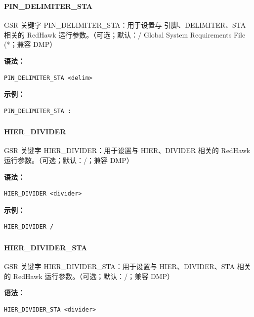 \subsubsection{}
\paragraph*{PIN_DELIMITER_STA}

GSR 关键字 PIN_DELIMITER_STA：用于设置与 引脚、DELIMITER、STA 相关的 RedHawk 运行参数。（可选；默认：/ Global System Requirements File (*；兼容 DMP）

\textbf{语法：}
\begin{lstlisting}
PIN_DELIMITER_STA <delim>
\end{lstlisting}

\textbf{示例：}
\begin{lstlisting}
PIN_DELIMITER_STA :
\end{lstlisting}

\subsubsection{}
\paragraph*{HIER_DIVIDER}

GSR 关键字 HIER_DIVIDER：用于设置与 HIER、DIVIDER 相关的 RedHawk 运行参数。（可选；默认：/；兼容 DMP）

\textbf{语法：}
\begin{lstlisting}
HIER_DIVIDER <divider>
\end{lstlisting}

\textbf{示例：}
\begin{lstlisting}
HIER_DIVIDER /
\end{lstlisting}

\subsubsection{}
\paragraph*{HIER_DIVIDER_STA}

GSR 关键字 HIER_DIVIDER_STA：用于设置与 HIER、DIVIDER、STA 相关的 RedHawk 运行参数。（可选；默认：/；兼容 DMP）

\textbf{语法：}
\begin{lstlisting}
HIER_DIVIDER_STA <divider>
\end{lstlisting}

